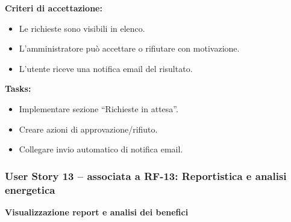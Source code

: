 \textbf{Criteri di accettazione:}
\begin{itemize}
    \item Le richieste sono visibili in elenco.
    \item L’amministratore può accettare o rifiutare con motivazione.
    \item L’utente riceve una notifica email del risultato.
\end{itemize}
\textbf{Tasks:}
\begin{itemize}
    \item Implementare sezione “Richieste in attesa”.
    \item Creare azioni di approvazione/rifiuto.
    \item Collegare invio automatico di notifica email.
\end{itemize}

\subsubsection*{User Story 13 – associata a RF-13: Reportistica e analisi energetica}
\textbf{Visualizzazione report e analisi dei benefici}

